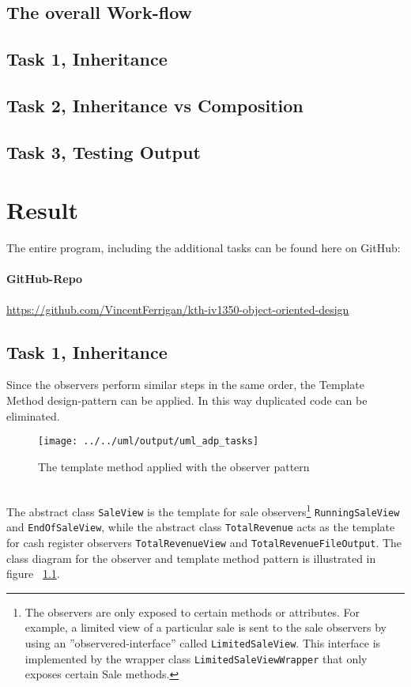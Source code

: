 \documentclass[a4paper]{scrreprt}
\begin{document}
\section*{The overall Work-flow}
\section*{Task 1, Inheritance}
\section*{Task 2, Inheritance vs Composition}
\section*{Task 3, Testing Output}

\newpage
\chapter{Result}
\label{sec:result}
The entire program, including the additional tasks can be found here on GitHub:

\subsubsection*{GitHub-Repo}
\url{https://github.com/VincentFerrigan/kth-iv1350-object-oriented-design}

\section*{Task 1, Inheritance}
Since the observers perform similar steps in the same order,
the Template Method design-pattern can be applied.
In this way duplicated code can be eliminated.

\begin{figure}[H]
    \begin{center}
        \texttt{[image: ../../uml/output/uml\_adp\_tasks]}
        \caption{The template method applied with the observer pattern}
        \label{fig:the-observers}
    \end{center}
\end{figure}

\\
The abstract class
\texttt{SaleView} is the template
for sale observers\footnote{The observers are only exposed to certain methods or attributes.
For example, a limited view of a particular sale is sent to the
sale observers by using an ''observered-interface'' called
\texttt{LimitedSaleView}.
This interface is implemented by the wrapper class
\texttt{LimitedSaleViewWrapper} that
only exposes certain Sale methods.}
\texttt{RunningSaleView} and
\texttt{EndOfSaleView},
while the abstract class
\texttt{TotalRevenue}
acts as the template for cash register observers
\texttt{TotalRevenueView} and
\texttt{TotalRevenueFileOutput}.
The class diagram for the observer and template method pattern
is illustrated in figure ~\ref{fig:the-observers}.
\end{document}
